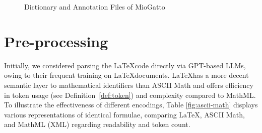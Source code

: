 \begin{figure}[htpb]
  \centering
  \quad 
  \caption[LaTeXML Preprocessing]{Dictionary and Annotation Files of MioGatto}\label{fig:miogatto-data}
\end{figure}

\section{Pre-processing}\label{sec:pre-processing}

Initially, we considered parsing the \LaTeX \space code directly via GPT-based LLMs, owing to their frequent training on \LaTeX \space documents. \LaTeX \space has a more decent semantic layer to mathematical identifiers than ASCII Math and offers efficiency in token usage (see Definition~\ref{def:token}) and complexity compared to MathML. To illustrate the effectiveness of different encodings, Table \ref{fig:ascii-math} displays various representations of identical formulae, comparing \LaTeX, ASCII Math, and MathML (XML) regarding readability and token count.


